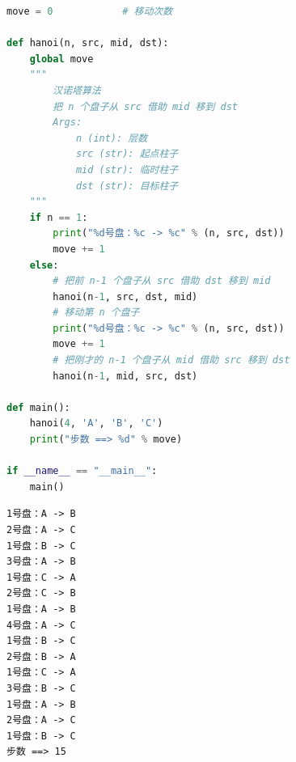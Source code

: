 \begin{lstlisting}[language=Python]
move = 0			# 移动次数

def hanoi(n, src, mid, dst):
	global move
	"""
		汉诺塔算法
		把 n 个盘子从 src 借助 mid 移到 dst
		Args:
			n (int): 层数
			src (str): 起点柱子
			mid (str): 临时柱子
			dst (str): 目标柱子
	"""
	if n == 1:
		print("%d号盘：%c -> %c" % (n, src, dst))
		move += 1
	else:
		# 把前 n-1 个盘子从 src 借助 dst 移到 mid
		hanoi(n-1, src, dst, mid)
		# 移动第 n 个盘子
		print("%d号盘：%c -> %c" % (n, src, dst))
		move += 1
		# 把刚才的 n-1 个盘子从 mid 借助 src 移到 dst
		hanoi(n-1, mid, src, dst)

def main():
	hanoi(4, 'A', 'B', 'C')
	print("步数 ==> %d" % move)

if __name__ == "__main__":
	main()
\end{lstlisting}

\begin{tcolorbox}
	\begin{verbatim}
1号盘：A -> B
2号盘：A -> C
1号盘：B -> C
3号盘：A -> B
1号盘：C -> A
2号盘：C -> B
1号盘：A -> B
4号盘：A -> C
1号盘：B -> C
2号盘：B -> A
1号盘：C -> A
3号盘：B -> C
1号盘：A -> B
2号盘：A -> C
1号盘：B -> C
步数 ==> 15
\end{verbatim}
\end{tcolorbox}

\newpage